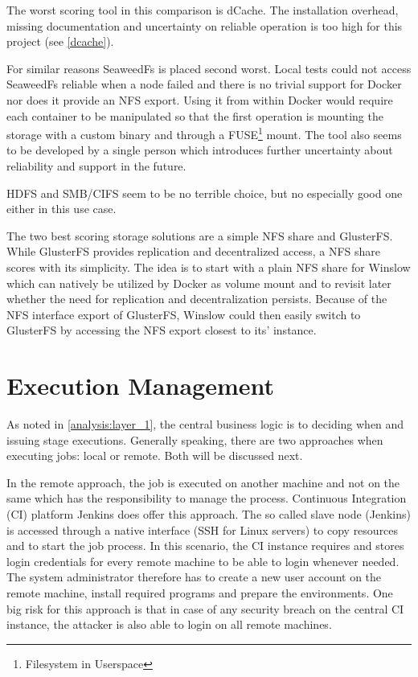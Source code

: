 The worst scoring tool in this comparison is dCache.
The installation overhead, missing documentation and uncertainty on reliable operation is too high for this project (see \autoref{dcache}).

For similar reasons SeaweedFs is placed second worst.
Local tests could not access SeaweedFs reliable when a node failed and there is no trivial support for Docker nor does it provide an NFS export.
Using it from within Docker would require each container to be manipulated so that the first operation is mounting the storage with a custom binary and through a FUSE\footnote{Filesystem in Userspace} mount.
The tool also seems to be developed by a single person which introduces further uncertainty about reliability and support in the future.

HDFS and SMB/CIFS seem to be no terrible choice, but no especially good one either in this use case.

The two best scoring storage solutions are a simple NFS share and GlusterFS.
While GlusterFS provides replication and decentralized access, a NFS share scores with its simplicity.
The idea is to start with a plain NFS share for Winslow which can natively be utilized by Docker as volume mount and to revisit later whether the need for replication and decentralization persists.
Because of the NFS interface export of GlusterFS, Winslow could then easily switch to GlusterFS by accessing the NFS export closest to its' instance.



\section{Execution Management}

As noted in \autoref{analysis:layer_1}, the central business logic is to deciding when and issuing stage executions.
Generally speaking, there are two approaches when executing jobs: local or remote. Both will be discussed next.

In the remote approach, the job is executed on another machine and not on the same which has the responsibility to manage the process.
Continuous Integration (CI) platform Jenkins\cite{jenkins:main} does offer this approach.
The so called slave node (Jenkins) is accessed through a native interface (SSH for Linux servers) to copy resources and to start the job process.
In this scenario, the CI instance requires and stores login credentials for every remote machine to be able to login whenever needed.
The system administrator therefore has to create a new user account on the remote machine, install required programs and prepare the environments.
One big risk for this approach is that in case of any security breach on the central CI instance, the attacker is also able to login on all remote machines.

